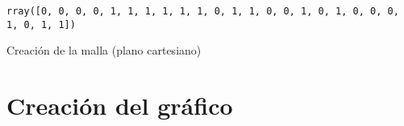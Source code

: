 \begin{Shaded}
\begin{Highlighting}[]
\end{Highlighting}
\end{Shaded}

\begin{verbatim}
rray([0, 0, 0, 0, 1, 1, 1, 1, 1, 1, 0, 1, 1, 0, 0, 1, 0, 1, 0, 0, 0, 1, 0, 1, 1])
\end{verbatim}

Creación de la malla (plano cartesiano)

\begin{Shaded}
\begin{Highlighting}[]
\OperatorTok{=}
\OperatorTok{=}\NormalTok{ X\_set.iloc[:,}\NormalTok{].}\NormalTok{()}\OperatorTok{{-}}\OperatorTok{=}\NormalTok{ X\_set.iloc[:,}\NormalTok{].}\NormalTok{()}\OperatorTok{+}\OperatorTok{=}\NormalTok{),}
\OperatorTok{=}\NormalTok{ X\_set.iloc[:,}\NormalTok{].}\NormalTok{()}\OperatorTok{{-}}\OperatorTok{=}\NormalTok{ X\_set.iloc[:,}\NormalTok{].}\NormalTok{()}\OperatorTok{+}\OperatorTok{=}\NormalTok{)}
\NormalTok{)}
\end{Highlighting}
\end{Shaded}

\section{Creación del gráfico}\label{creaciuxf3n-del-gruxe1fico}

